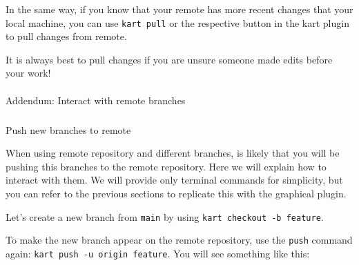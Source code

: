 \documentclass[
  letterpaper,
  DIV=11,
  numbers=noendperiod]{scrartcl}
\makeatletter
\let\oldparagraph\paragraph
\renewcommand{\paragraph}{
    \@ifstar
      \xxxParagraphStar
      \xxxParagraphNoStar
  }
\newcommand{\xxxParagraphStar}[1]{\oldparagraph*{#1}\mbox{}}
\newcommand{\xxxParagraphNoStar}[1]{\oldparagraph{#1}\mbox{}}
\let\oldsubparagraph\subparagraph
\renewcommand{\subparagraph}{
    \@ifstar
      \xxxSubParagraphStar
      \xxxSubParagraphNoStar
  }
\newcommand{\xxxSubParagraphStar}[1]{\oldsubparagraph*{#1}\mbox{}}
\newcommand{\xxxSubParagraphNoStar}[1]{\oldsubparagraph{#1}\mbox{}}
\makeatother
\begin{document}
\begin{tcolorbox}[enhanced jigsaw, colframe=quarto-callout-note-color-frame, colbacktitle=quarto-callout-note-color!10!white, rightrule=.15mm, opacitybacktitle=0.6, opacityback=0, bottomrule=.15mm, coltitle=black, title=\textcolor{quarto-callout-note-color}{\faInfo}\hspace{0.5em}{Note}, left=2mm, bottomtitle=1mm, toptitle=1mm, toprule=.15mm, breakable, titlerule=0mm, colback=white, leftrule=.75mm, arc=.35mm]

In the same way, if you know that your remote has more recent changes
that your local machine, you can use \texttt{kart\ pull} or the
respective button in the kart plugin to pull changes from remote.

It is always best to pull changes if you are unsure someone made edits
before your work!

\end{tcolorbox}

\paragraph{Addendum: Interact with remote
branches}\label{addendum-interact-with-remote-branches}

\subparagraph{Push new branches to
remote}\label{push-new-branches-to-remote}

When using remote repository and different branches, is likely that you
will be pushing this branches to the remote repository. Here we will
explain how to interact with them. We will provide only terminal
commands for simplicity, but you can refer to the previous sections to
replicate this with the graphical plugin.

Let's create a new branch from \texttt{main} by using
\texttt{kart\ checkout\ -b\ feature}.

To make the new branch appear on the remote repository, use the
\texttt{push} command again: \texttt{kart\ push\ -u\ origin\ feature}.
You will see something like this:
\end{document}
